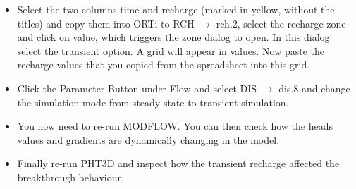 \begin{itemize} 
\item Select the two columns time and recharge (marked in yellow, without the titles) 
and copy them into ORTi to {\color{blue}RCH} $\rightarrow$ {\color{blue}rch.2}, 
select the recharge zone and click on {\color{blue}value}, which triggers the {\color{blue}zone dialog} to open. 
In this dialog select the {\color{blue}transient} option. A grid will appear in {\color{blue}values}.
Now paste the recharge values that you copied from the spreadsheet into this grid. 

\item Click the {\color{blue}Parameter} Button under {\color{blue}Flow} 
and select {\color{blue}DIS} $\rightarrow$ {\color{blue}dis.8} and change the simulation mode from 
{\color{blue}steady-state} to {\color{blue}transient} simulation.

\item You now need to re-run MODFLOW. You can then check 
how the heads values and gradients are dynamically changing in the model.

\item Finally re-run PHT3D and inspect how the transient recharge affected the breakthrough behaviour.

\end{itemize}

